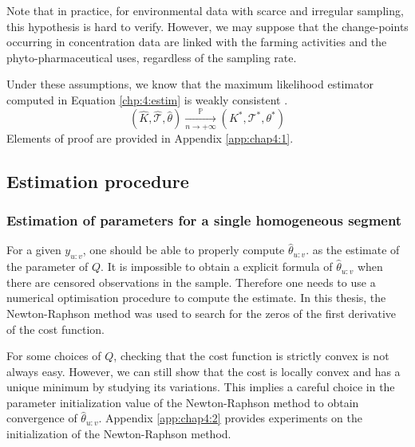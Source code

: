 Note that in practice, for environmental data with scarce and irregular sampling, this hypothesis is hard to verify.
However, we may suppose that the change-points occurring in concentration data are linked with the farming activities and the phyto-pharmaceutical uses, regardless of the sampling rate. 

Under these assumptions, we know that the maximum likelihood estimator computed in Equation \eqref{chp:4:estim} is weakly consistent \citep{Lavielle1997}. \begin{equation}
(\widehat{K},\widehat{\mathcal{T}},\widehat{\theta}) \xrightarrow[n\to+\infty]{\mathbb{P}} (K^*,\mathcal{T}^*,\theta^*)
\end{equation}
Elements of proof are provided in Appendix \ref{app:chap4:1}. 


\subsection{Estimation procedure}

\subsubsection{Estimation of parameters for a single homogeneous segment}

For a given $y_{u:v}$, one should be able to properly compute $\widehat{\theta}_{u:v}$. as the estimate of the parameter of $Q$. It is impossible to obtain a explicit formula of $\widehat{\theta}_{u:v}$ when there are censored observations in the sample. Therefore one needs to use a numerical optimisation procedure to compute the estimate. In this thesis, the Newton-Raphson method was used to search for the zeros of the first derivative of the cost function.  

For some choices of $Q$, checking that the cost function is strictly convex is not always easy. However, we can still show that the cost is locally convex and has a unique minimum by studying its variations. This implies a careful choice in the parameter initialization value of the Newton-Raphson method to obtain convergence of $\widehat{\theta}_{u:v}$. Appendix \ref{app:chap4:2} provides experiments on the initialization of the Newton-Raphson method. 

